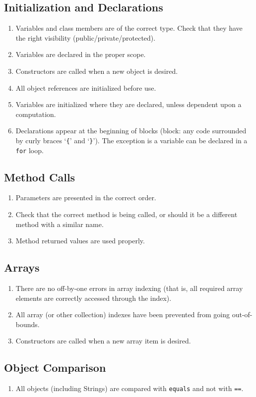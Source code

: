 \documentclass{article}
\begin{document}
\subsection*{Initialization and Declarations}\begin{enumerate}[resume]
\item Variables and class members are of the correct type. Check that they have the right visibility (public/private/protected).
\item Variables are declared in the proper scope.
\item Constructors are called when a new object is desired.
\item All object references are initialized before use.
\item Variables are initialized where they are declared, unless dependent upon a computation.
\item Declarations appear at the beginning of blocks (block: any code surrounded by curly braces `\texttt{\{}' and `\texttt{\}}'). The exception is a variable can be declared in a \texttt{for} loop.
\end{enumerate}
\subsection*{Method Calls}\begin{enumerate}[resume]
\item Parameters are presented in the correct order.
\item Check that the correct method is being called, or should it be a different method with a similar name.
\item Method returned values are used properly.
\end{enumerate}

\subsection*{Arrays}\begin{enumerate}[resume]
\item There are no off-by-one errors in array indexing (that is, all required array elements are correctly accessed through the index).
\item All array (or other collection) indexes have been prevented from going out-of-bounds.
\item Constructors are called when a new array item is desired.
\end{enumerate}

\subsection*{Object Comparison}\begin{enumerate}[resume]
\item All objects (including Strings) are compared with \texttt{equals} and not with \texttt{==}.
\end{enumerate}
\end{document}
